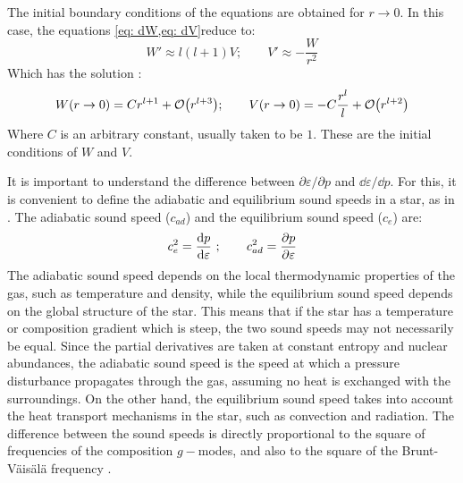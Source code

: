 \documentclass[a4paper,12pt,onehalfspacing]{report}
\begin{document}
The initial boundary conditions of the equations are obtained for $r\to 0$. In this case, the equations \cref{eq: dW,eq: dV}reduce to:
\[W'\approx l(l+1)V;\qquad V'\approx -\frac{W}{r^2}\]
Which has the solution \cite{Sotani}:
\begin{equation}
    W(r\to 0)= Cr^{l+1}+ \mathcal{O}\qty(r^{l+3});\qquad V(r\to 0)= -C\frac{r^l}{l}+ \mathcal{O}\qty(r^{l+2})
\end{equation}
Where $C$ is an arbitrary constant, usually taken to be $1$. These are the initial conditions of $W$ and $V$.

It is important to understand the difference between $\partial \varepsilon/ \partial p$ and $\dd\varepsilon/ \dd p$. For this, it is convenient to define the adiabatic and equilibrium sound speeds in a star, as in \cite{Zhao_Jaik_quasinormal_g}. The adiabatic sound speed ($c_{ad}$) and the equilibrium sound speed ($c_e$) are:
\[c_e^2= \dv{p}{\varepsilon}\ ;\qquad c^2_{ad}= \pdv{p}{\varepsilon}\]
The adiabatic sound speed depends on the local thermodynamic properties of the gas, such as temperature and density, while the equilibrium sound speed depends on the global structure of the star. This means that if the star has a temperature or composition gradient which is steep, the two sound speeds may not necessarily be equal. Since the partial derivatives are taken at constant entropy and nuclear abundances, the adiabatic sound speed is the speed at which a pressure disturbance propagates through the gas, assuming no heat is exchanged with the surroundings. On the other hand, the equilibrium sound speed takes into account the heat transport mechanisms in the star, such as convection and radiation. The difference between the sound speeds is directly proportional to the square of frequencies of the composition $g-$modes, and also to the square of the Brunt-Väisälä frequency \cite{Jaik_tale_2_sounds}.
\end{document}
